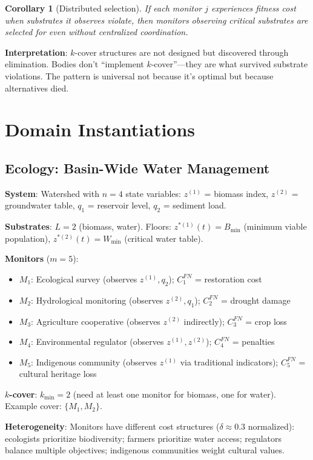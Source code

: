 \documentclass[11pt,a4paper]{article}
\newtheorem{corollary}[theorem]{Corollary}
\theoremstyle{definition}
\begin{document}
\begin{corollary}[Distributed selection]
If each monitor $j$ experiences fitness cost when substrates it observes violate, then monitors observing critical substrates are selected for even without centralized coordination.
\end{corollary}

\textbf{Interpretation}: $k$-cover structures are not designed but discovered through elimination. Bodies don't ``implement $k$-cover''---they are what survived substrate violations. The pattern is universal not because it's optimal but because alternatives died.

\section{Domain Instantiations}

\subsection{Ecology: Basin-Wide Water Management}

\textbf{System}: Watershed with $n=4$ state variables: $z^{(1)}$ = biomass index, $z^{(2)}$ = groundwater table, $q_1$ = reservoir level, $q_2$ = sediment load.

\textbf{Substrates}: $L = 2$ (biomass, water). Floors: $z^{*(1)}(t) = B_{\min}$ (minimum viable population), $z^{*(2)}(t) = W_{\min}$ (critical water table).

\textbf{Monitors} ($m = 5$):
\begin{itemize}
\item $M_1$: Ecological survey (observes $z^{(1)}, q_2$); $C_1^{FN}$ = restoration cost
\item $M_2$: Hydrological monitoring (observes $z^{(2)}, q_1$); $C_2^{FN}$ = drought damage
\item $M_3$: Agriculture cooperative (observes $z^{(2)}$ indirectly); $C_3^{FN}$ = crop loss
\item $M_4$: Environmental regulator (observes $z^{(1)}, z^{(2)}$); $C_4^{FN}$ = penalties
\item $M_5$: Indigenous community (observes $z^{(1)}$ via traditional indicators); $C_5^{FN}$ = cultural heritage loss
\end{itemize}

\textbf{$k$-cover}: $k_{\min} = 2$ (need at least one monitor for biomass, one for water). Example cover: $\{M_1, M_2\}$.

\textbf{Heterogeneity}: Monitors have different cost structures ($\delta \approx 0.3$ normalized): ecologists prioritize biodiversity; farmers prioritize water access; regulators balance multiple objectives; indigenous communities weight cultural values.
\end{document}
